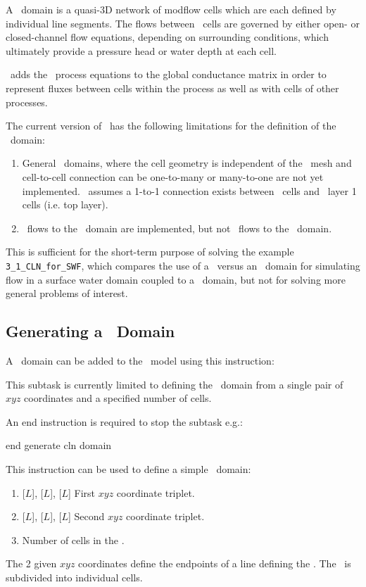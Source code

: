 \label{texfile:CLN}
A \cln\ domain is a quasi-3D network of modflow cells which are each defined by individual line segments. The flows between \cln\ cells are governed by either open- or closed-channel flow equations, depending on surrounding conditions, which ultimately provide a pressure head or water depth at each cell.

\mut\ adds the \cln\ process equations to the global
conductance matrix in order to represent fluxes between cells
within the process as well as with cells of other processes.

The current version of \mut\ has the following limitations for the definition of the \cln\ domain:
\begin{enumerate}
    \item General \cln\ domains, where the cell geometry is independent of the \gwf\ mesh and  cell-to-cell connection can be one-to-many or many-to-one are not yet implemented. \mut\ assumes a 1-to-1 connection exists between \cln\ cells and \gwf\ layer 1 cells (i.e. top layer).
    \item \cln\ flows to the \gwf\ domain are implemented, but not  \cln\ flows to the \swf\ domain.
\end{enumerate}

This is sufficient for the short-term purpose of solving the example \texttt{3\_1\_CLN\_for\_SWF}, which compares the use of a \cln\ versus an \swf\ domain for simulating flow in a surface water domain coupled to a \gwf\ domain, but not for solving more general problems of interest.

\subsection{Generating a \cln\ Domain}
A \cln\ domain can be added to the \mfus\ model using this instruction:

    {This subtask is currently limited to defining the \cln\ domain from a single pair of $xyz$ coordinates and a specified number of cells.

    An end instruction is required to stop the subtask e.g.:
    
    {\Large \sf end generate cln domain}
    }

This instruction can be used to define a simple \cln\ domain:

    {
        \squish
        \begin{enumerate}
        \item {} [$L$],  [$L$],  [$L$]  First $xyz$ coordinate triplet.
        \item {} [$L$],  [$L$],  [$L$]  Second $xyz$ coordinate triplet.
        \item {}  Number of cells in the \cln.
        \end{enumerate}
        The 2 given $xyz$ coordinates define the endpoints of a line defining the \cln.  The \cln\ is subdivided into  individual cells.
    }


